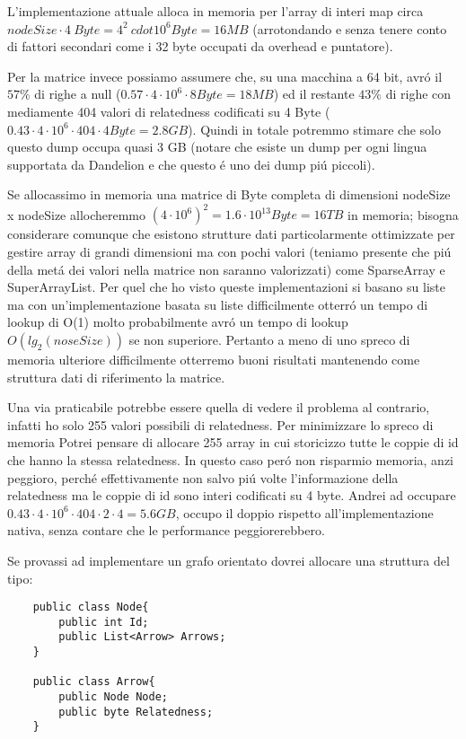L'implementazione attuale alloca in memoria per l'array di interi map circa 
$nodeSize \cdot 4\ Byte = 4^2 \ cdot 10^6 Byte = 16 MB$ (arrotondando e senza tenere conto di fattori secondari come i 32 byte occupati da overhead e puntatore).

Per la matrice invece possiamo assumere che, su una macchina a 64 bit, avr\'o il $57\%$ di righe a null ($0.57 \cdot 4\cdot 10^6 \cdot 8 Byte = 18 MB$) ed il 
restante $43\%$ di righe con mediamente 404 valori di relatedness codificati su 4 Byte ($0.43 \cdot 4 \cdot 10^6 \cdot 404 \cdot 4 Byte = 2.8 GB$). 
Quindi in totale potremmo stimare che solo questo dump occupa quasi 3 GB (notare che esiste un dump per ogni lingua supportata da Dandelion e che questo \'e uno 
dei dump pi\'u piccoli).

Se allocassimo in memoria una matrice di Byte completa di dimensioni nodeSize x nodeSize allocheremmo $(4 \cdot 10^6)^2 = 1.6 \cdot 10^13 Byte = 16 TB$ in memoria; 
bisogna considerare comunque che esistono strutture dati particolarmente ottimizzate per gestire array di grandi dimensioni ma con pochi valori (teniamo presente che
pi\'u della met\'a dei valori nella matrice non saranno valorizzati) come SparseArray e SuperArrayList. Per quel che ho visto queste implementazioni 
si basano su liste ma con un'implementazione basata su liste difficilmente otterr\'o un tempo di lookup di O(1) molto probabilmente avr\'o un tempo di lookup $O(lg_2(noseSize))$
se non superiore. Pertanto a meno di uno spreco di memoria ulteriore difficilmente otterremo buoni risultati mantenendo come struttura dati di riferimento la matrice. 

Una via praticabile potrebbe essere quella di vedere il problema al contrario, infatti ho solo 255 valori possibili di relatedness. Per minimizzare lo spreco di memoria 
Potrei pensare di allocare 255 array in cui storicizzo tutte le coppie di id che hanno la stessa relatedness. In questo caso per\'o non risparmio memoria, anzi peggioro,
perch\'e effettivamente non salvo pi\'u volte l'informazione della relatedness ma le coppie di id sono interi codificati su 4 byte. 
Andrei ad occupare $0.43 \cdot 4 \cdot 10^6 \cdot 404 \cdot 2 \cdot 4 = 5.6 GB$, occupo il doppio rispetto all'implementazione nativa, 
senza contare che le performance peggiorerebbero.

Se provassi ad implementare un grafo orientato dovrei allocare una struttura del tipo:
 
\begin{lstlisting}
    public class Node{
        public int Id;
        public List<Arrow> Arrows;  
    }

    public class Arrow{
        public Node Node;
        public byte Relatedness;
    }
\end{lstlisting}


